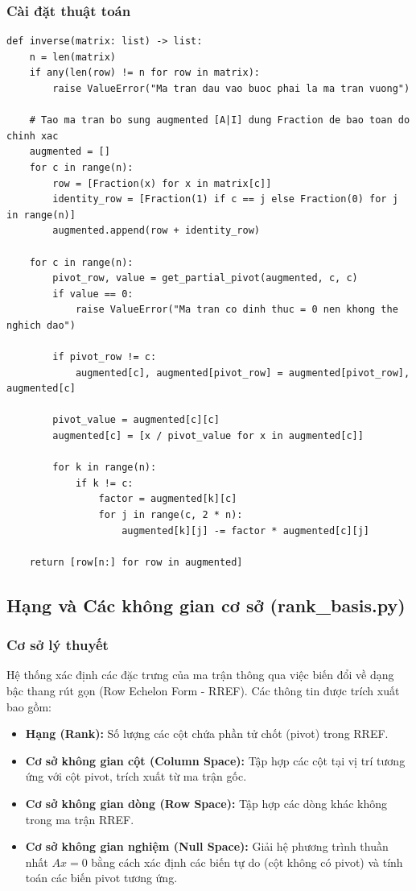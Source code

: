 \documentclass[a4paper,12pt]{article}
\begin{document}
\subsubsection{Cài đặt thuật toán}
\begin{lstlisting}[caption=Mã nguồn tìm ma trận nghịch đảo bằng Gauss-Jordan]
def inverse(matrix: list) -> list:
    n = len(matrix)
    if any(len(row) != n for row in matrix):
        raise ValueError("Ma tran dau vao buoc phai la ma tran vuong")

    # Tao ma tran bo sung augmented [A|I] dung Fraction de bao toan do chinh xac
    augmented = []
    for c in range(n):
        row = [Fraction(x) for x in matrix[c]]
        identity_row = [Fraction(1) if c == j else Fraction(0) for j in range(n)]
        augmented.append(row + identity_row)

    for c in range(n):
        pivot_row, value = get_partial_pivot(augmented, c, c)
        if value == 0:
            raise ValueError("Ma tran co dinh thuc = 0 nen khong the nghich dao")

        if pivot_row != c:
            augmented[c], augmented[pivot_row] = augmented[pivot_row], augmented[c]

        pivot_value = augmented[c][c]
        augmented[c] = [x / pivot_value for x in augmented[c]]

        for k in range(n):
            if k != c:
                factor = augmented[k][c]
                for j in range(c, 2 * n):
                    augmented[k][j] -= factor * augmented[c][j]

    return [row[n:] for row in augmented]
\end{lstlisting}

\subsection{Hạng và Các không gian cơ sở (rank\_basis.py)}

\subsubsection{Cơ sở lý thuyết}
Hệ thống xác định các đặc trưng của ma trận thông qua việc biến đổi về dạng bậc thang rút gọn (Row Echelon Form - RREF). Các thông tin được trích xuất bao gồm:
\begin{itemize}
    \item \textbf{Hạng (Rank):} Số lượng các cột chứa phần tử chốt (pivot) trong RREF.
    \item \textbf{Cơ sở không gian cột (Column Space):} Tập hợp các cột tại vị trí tương ứng với cột pivot, trích xuất từ ma trận gốc.
    \item \textbf{Cơ sở không gian dòng (Row Space):} Tập hợp các dòng khác không trong ma trận RREF.
    \item \textbf{Cơ sở không gian nghiệm (Null Space):} Giải hệ phương trình thuần nhất $Ax = 0$ bằng cách xác định các biến tự do (cột không có pivot) và tính toán các biến pivot tương ứng.
\end{itemize}
\end{document}
